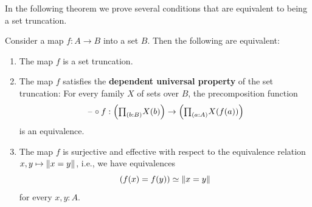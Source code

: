 In the following theorem we prove several conditions that are equivalent to being a set truncation.

\begin{thm}\label{thm:set-truncation}
  Consider a map $f:A\to B$ into a set $B$. Then the following are equivalent:
  \begin{enumerate}
  \item\label{item:is-set-truncation} The map $f$ is a set truncation.
  \item\label{item:dup-set-truncation} The map $f$ satisfies the \textbf{dependent universal property} of the set truncation: For every family $X$ of sets over $B$, the precomposition function
    \begin{equation*}
      \blank\circ f : \Big(\prd{b:B}X(b)\Big)\to\Big(\prd{a:A}X(f(a))\Big)
    \end{equation*}
    is an equivalence.
  \item\label{item:is-quotient-set-truncation} The map $f$ is surjective and effective with respect to the equivalence relation $x,y\mapsto\Vert x=y\Vert_{}$, i.e., we have equivalences
    \begin{equation*}
      (f(x)=f(y))\simeq \Vert x=y\Vert_{}
    \end{equation*}
    for every $x,y:A$.
  \end{enumerate}
\end{thm}

